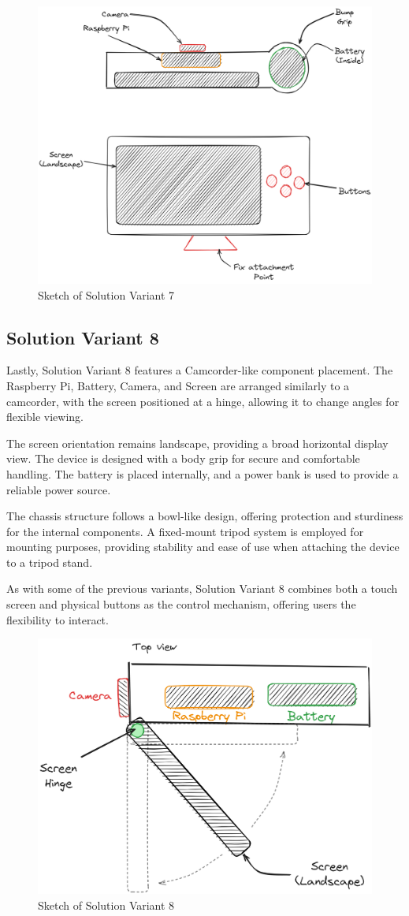 \begin{figure}[H]
    \centering
    \includegraphics[width=0.5\linewidth]{texs/Part1/chapter3/image/v7.png}
    \caption{Sketch of Solution Variant 7}
    \label{fig:sketch-solution-variant-7}
\end{figure}

\subsection{Solution Variant 8}
Lastly, Solution Variant 8 features a Camcorder-like component placement. The Raspberry Pi, Battery, Camera, and Screen are arranged similarly to a camcorder, with the screen positioned at a hinge, allowing it to change angles for flexible viewing.

The screen orientation remains landscape, providing a broad horizontal display view. The device is designed with a body grip for secure and comfortable handling. The battery is placed internally, and a power bank is used to provide a reliable power source.

The chassis structure follows a bowl-like design, offering protection and sturdiness for the internal components. A fixed-mount tripod system is employed for mounting purposes, providing stability and ease of use when attaching the device to a tripod stand.

As with some of the previous variants, Solution Variant 8 combines both a touch screen and physical buttons as the control mechanism, offering users the flexibility to interact.

\begin{figure}[H]
    \centering
    \includegraphics[width=0.5\linewidth]{texs/Part1/chapter3/image/v8.png}
    \caption{Sketch of Solution Variant 8}
    \label{fig:sketch-solution-variant-8}
\end{figure}

